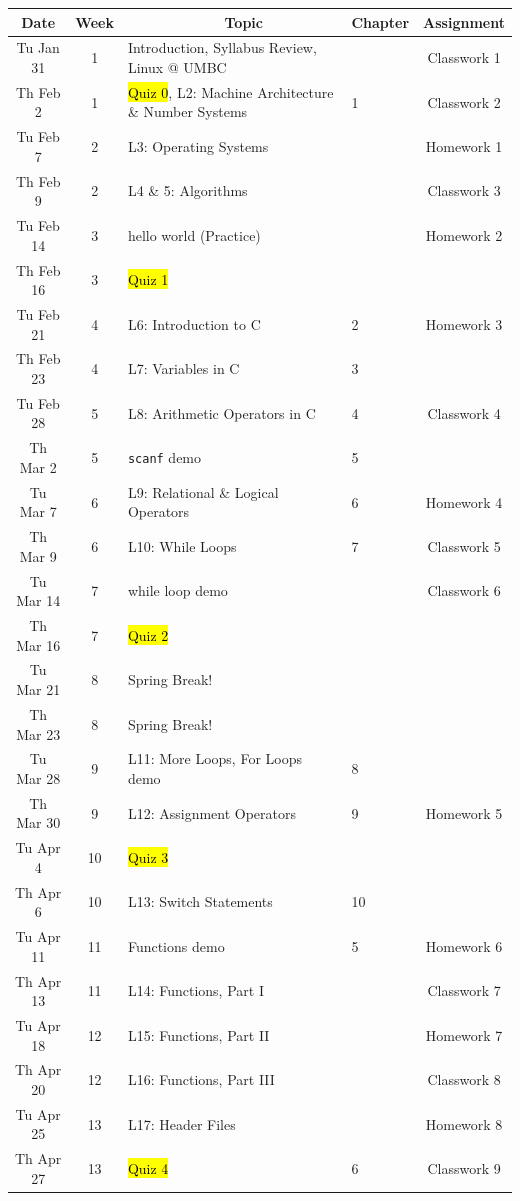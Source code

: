 \documentclass[letter,11pt]{article}
\begin{document}
\small
\begin{tabular}{c c l l c}
Date & Week & ~~~~~~~~~~~~Topic & Chapter & Assignment \\
\hline
Tu Jan 31  & 1 & Introduction, Syllabus Review, Linux @ UMBC & & Classwork 1  \\ \hline

Th Feb 2  & 1 & \hl{Quiz 0}, L2: Machine Architecture \& Number Systems & 1 & Classwork 2 \\
Tu Feb 7  & 2 & L3: Operating Systems & & Homework 1 \\
Th Feb 9 & 2 & L4 \& 5: Algorithms & & Classwork 3 \\
Tu Feb 14 & 3 & hello world (Practice) & & Homework 2 \\
Th Feb 16 & 3 & \hl{Quiz 1} & &  \\
Tu Feb 21 & 4 & L6: Introduction to C & 2 & Homework 3\\
Th Feb 23 & 4 & L7: Variables in C & 3 \\

Tu Feb 28 & 5 & L8: Arithmetic Operators in C & 4 & Classwork 4 \\ \hline
Th Mar 2 & 5 & \texttt{scanf} demo & 5 &  \\
Tu Mar 7 & 6 & L9: Relational \& Logical Operators & 6 & Homework 4 \\
Th Mar 9 & 6 & L10: While Loops & 7 & Classwork 5 \\
Tu Mar 14 & 7 & while loop demo & & Classwork 6 \\
Th Mar 16 & 7 & \hl{Quiz 2} & & \\
Tu Mar 21 & 8 & {\color{cadmiumgreen}Spring Break!} & & \\
Th Mar 23 & 8 & {\color{cadmiumgreen}Spring Break!} & &  \\
Tu Mar 28 & 9 & L11: More Loops, For Loops demo & 8 &  \\
Th Mar 30 & 9 & L12: Assignment Operators & 9 & Homework 5\\ \hline

Tu Apr 4 & 10 & \hl{Quiz 3} & & \\
Th Apr 6 & 10 & L13: Switch Statements & 10 & \\
Tu Apr 11 & 11 & Functions demo & 5 & Homework 6\\
Th Apr 13 & 11 & L14: Functions, Part I & & Classwork 7  \\
Tu Apr 18 & 12 & L15: Functions, Part II & &  Homework 7 \\
Th Apr 20 & 12 & L16: Functions, Part III  & & Classwork 8 \\
Tu Apr 25 & 13 & L17: Header Files & & Homework 8\\
Th Apr 27 & 13 & \hl{Quiz 4} & 6 & Classwork 9 \\ \hline


\end{tabular}
\end{document}
